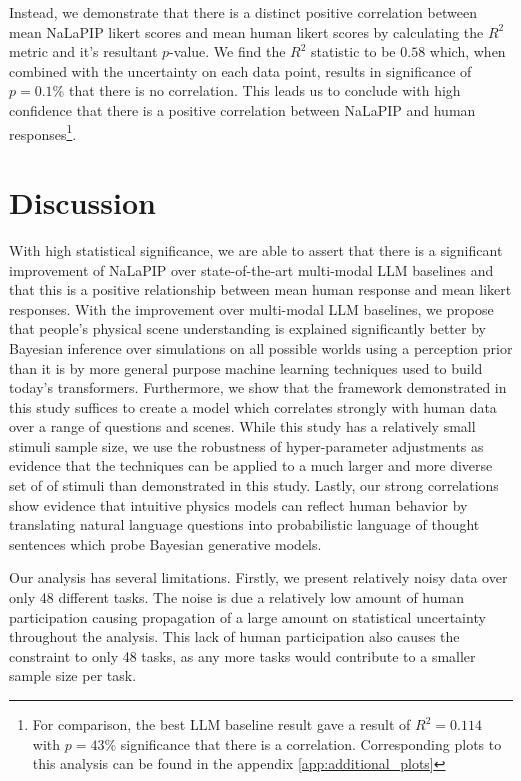 \documentclass[10pt,letterpaper]{article}
\begin{document}
Instead, we demonstrate that there is a distinct positive correlation between mean NaLaPIP likert scores and mean human likert scores by calculating the $R^2$ metric and it's resultant $p$-value. We find the $R^2$ statistic to be $0.58$ which, when combined with the uncertainty on each data point, results in significance of $p=0.1\%$ that there is no correlation. This leads us to conclude with high confidence that there is a positive correlation between NaLaPIP and human responses\footnote{For comparison, the best LLM baseline result gave a result of $R^2 = 0.114$ with $p=43\%$ significance that there is a correlation. Corresponding plots to this analysis can be found in the appendix \autoref{app:additional_plots}}.




\section{Discussion}

With high statistical significance, we are able to assert that there is a significant improvement of NaLaPIP over state-of-the-art multi-modal LLM baselines and that this is a positive relationship between mean human response and mean likert responses. 
With the improvement over multi-modal LLM baselines, we propose that people's physical scene understanding is explained significantly better by Bayesian inference over simulations on all possible worlds using a perception prior than it is by more general purpose machine learning techniques used to build today's transformers. Furthermore, we show that the framework demonstrated in this study suffices to create a model which correlates strongly with human data over a range of questions and scenes. While this study has a relatively small stimuli sample size, we use the robustness of hyper-parameter adjustments as evidence that the techniques can be applied to a much larger and more diverse set of of stimuli than demonstrated in this study. Lastly, our strong correlations show evidence that intuitive physics models can reflect human behavior by translating natural language questions into probabilistic language of thought sentences which probe Bayesian generative models. 

Our analysis has several limitations. Firstly, we present relatively noisy data over only 48 different tasks. The noise is due a relatively low amount of human participation causing propagation of a large amount on statistical uncertainty throughout the analysis. This lack of human participation also causes the constraint to only 48 tasks, as any more tasks would contribute to a smaller sample size per task. 
\end{document}
